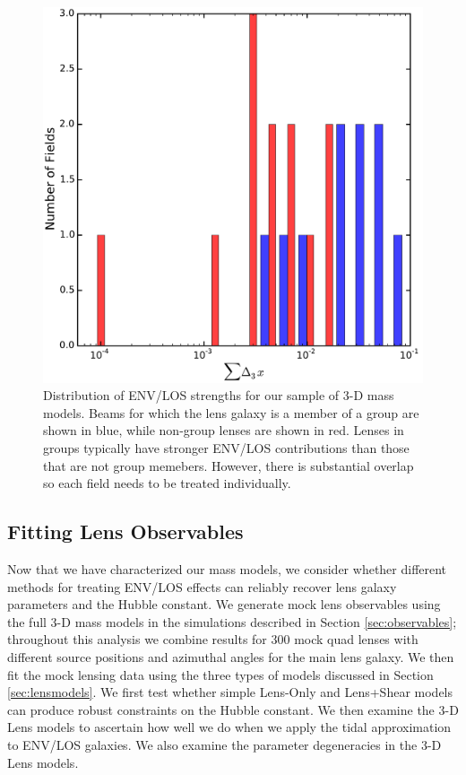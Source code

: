 \documentclass{emulateapj}
\begin{document}
\begin{figure}[!t]
\centering
\includegraphics[width=\columnwidth]{d3xsums.pdf}
\caption{Distribution of ENV/LOS strengths for our sample of 3-D mass models. Beams for which the lens galaxy is a member of a group are shown in blue, while non-group lenses are shown in red. Lenses in groups typically have stronger ENV/LOS contributions than those that are not group memebers. However, there is substantial overlap so each field needs to be treated individually.}
\label{fig:d3xsums}
\end{figure}

\subsection{Fitting Lens Observables}
\label{sec:fitting}
Now that we have characterized our mass models, we consider whether different methods for treating ENV/LOS effects can reliably recover lens galaxy parameters and the Hubble constant. We generate mock lens observables using the full 3-D mass models in the simulations described in Section \ref{sec:observables}; throughout this analysis we combine results for 300 mock quad lenses with different source positions and azimuthal angles for the main lens galaxy. We then fit the mock lensing data using the three types of models discussed in Section \ref{sec:lensmodels}. We first test whether simple Lens-Only and Lens+Shear models can produce robust constraints on the Hubble constant. We then examine the 3-D Lens models to ascertain how well we do when we apply the tidal approximation to ENV/LOS galaxies. We also examine the parameter degeneracies in the 3-D Lens models.
\end{document}
